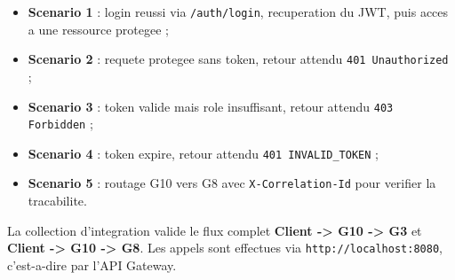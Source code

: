 \documentclass[12pt, a4paper]{article}
\begin{document}
\begin{itemize}
  \item \textbf{Scenario 1} : login reussi via \texttt{/auth/login}, recuperation du JWT, puis acces a une ressource protegee ;
  \item \textbf{Scenario 2} : requete protegee sans token, retour attendu \texttt{401 Unauthorized} ;
  \item \textbf{Scenario 3} : token valide mais role insuffisant, retour attendu \texttt{403 Forbidden} ;
  \item \textbf{Scenario 4} : token expire, retour attendu \texttt{401 INVALID\_TOKEN} ;
  \item \textbf{Scenario 5} : routage G10 vers G8 avec \texttt{X-Correlation-Id} pour verifier la tracabilite.
\end{itemize}

La collection d'integration valide le flux complet \textbf{Client -> G10 -> G3} et \textbf{Client -> G10 -> G8}. Les appels sont effectues via \texttt{http://localhost:8080}, c'est-a-dire par l'API Gateway.
\end{document}
